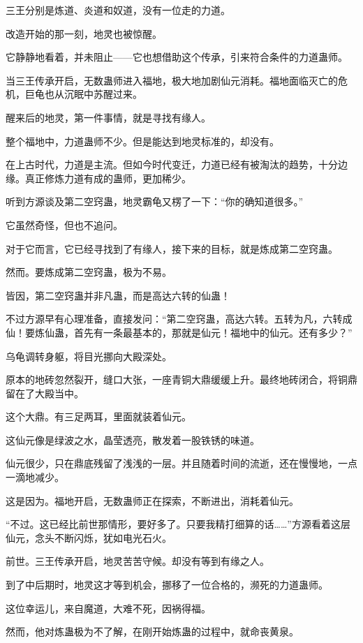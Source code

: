 \begin{this_body}
三王分别是炼道、炎道和奴道，没有一位走的力道。

改造开始的那一刻，地灵也被惊醒。

它静静地看着，并未阻止——它也想借助这个传承，引来符合条件的力道蛊师。

当三王传承开启，无数蛊师进入福地，极大地加剧仙元消耗。福地面临灭亡的危机，巨龟也从沉眠中苏醒过来。

醒来后的地灵，第一件事情，就是寻找有缘人。

整个福地中，力道蛊师不少。但是能达到地灵标准的，却没有。

在上古时代，力道是主流。但如今时代变迁，力道已经有被淘汰的趋势，十分边缘。真正修炼力道有成的蛊师，更加稀少。

听到方源谈及第二空窍蛊，地灵霸龟又楞了一下：“你的确知道很多。”

它虽然奇怪，但也不追问。

对于它而言，它已经寻找到了有缘人，接下来的目标，就是炼成第二空窍蛊。

然而。要炼成第二空窍蛊，极为不易。

皆因，第二空窍蛊并非凡蛊，而是高达六转的仙蛊！

不过方源早有心理准备，直接发问：“第二空窍蛊，高达六转。五转为凡，六转成仙！要炼仙蛊，首先有一条最基本的，那就是仙元！福地中的仙元。还有多少？”

乌龟调转身躯，将目光挪向大殿深处。

原本的地砖忽然裂开，缝口大张，一座青铜大鼎缓缓上升。最终地砖闭合，将铜鼎留在了大殿当中。

这个大鼎。有三足两耳，里面就装着仙元。

这仙元像是绿波之水，晶莹透亮，散发着一股铁锈的味道。

仙元很少，只在鼎底残留了浅浅的一层。并且随着时间的流逝，还在慢慢地，一点一滴地减少。

这是因为。福地开启，无数蛊师正在探索，不断进出，消耗着仙元。

“不过。这已经比前世那情形，要好多了。只要我精打细算的话……”方源看着这层仙元，念头不断闪烁，犹如电光石火。

前世。三王传承开启，地灵苦苦守候。却没有等到有缘之人。

到了中后期时，地灵这才等到机会，挪移了一位合格的，濒死的力道蛊师。

这位幸运儿，来自魔道，大难不死，因祸得福。

然而，他对炼蛊极为不了解，在刚开始炼蛊的过程中，就命丧黄泉。


\end{this_body}
